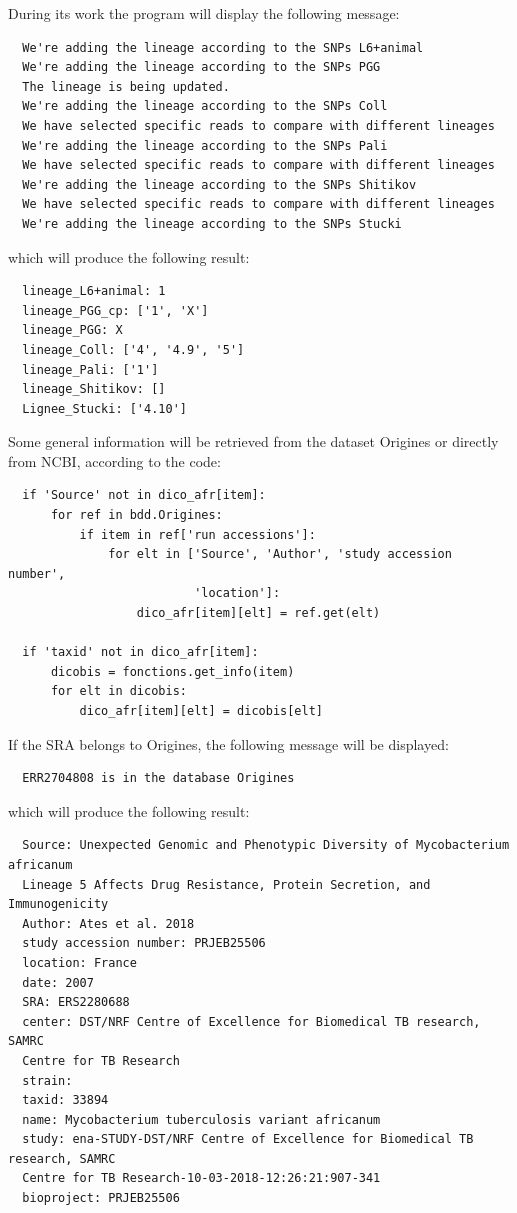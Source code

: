 \documentclass[twoside,a4paper,11pt,frenchb,openany]{report}
\begin{document}
    During its work the program will display the following message:

    \begin{verbatim}
  We're adding the lineage according to the SNPs L6+animal
  We're adding the lineage according to the SNPs PGG
  The lineage is being updated.
  We're adding the lineage according to the SNPs Coll
  We have selected specific reads to compare with different lineages
  We're adding the lineage according to the SNPs Pali
  We have selected specific reads to compare with different lineages
  We're adding the lineage according to the SNPs Shitikov
  We have selected specific reads to compare with different lineages
  We're adding the lineage according to the SNPs Stucki
\end{verbatim}

    which will produce the following result:

    \begin{verbatim}
  lineage_L6+animal: 1
  lineage_PGG_cp: ['1', 'X']
  lineage_PGG: X
  lineage_Coll: ['4', '4.9', '5']
  lineage_Pali: ['1']
  lineage_Shitikov: []
  Lignee_Stucki: ['4.10']
\end{verbatim}

    Some general information will be retrieved from the dataset Origines or
directly from NCBI, according to the code:

\begin{verbatim}
  if 'Source' not in dico_afr[item]:
      for ref in bdd.Origines:
          if item in ref['run accessions']:
              for elt in ['Source', 'Author', 'study accession number',
                          'location']:
                  dico_afr[item][elt] = ref.get(elt)

  if 'taxid' not in dico_afr[item]:
      dicobis = fonctions.get_info(item)
      for elt in dicobis:
          dico_afr[item][elt] = dicobis[elt]
\end{verbatim}

    If the SRA belongs to Origines, the following message will be displayed:

    \begin{verbatim}
  ERR2704808 is in the database Origines
\end{verbatim}

    which will produce the following result:

    \begin{verbatim}
  Source: Unexpected Genomic and Phenotypic Diversity of Mycobacterium africanum   
  Lineage 5 Affects Drug Resistance, Protein Secretion, and Immunogenicity
  Author: Ates et al. 2018
  study accession number: PRJEB25506
  location: France
  date: 2007
  SRA: ERS2280688
  center: DST/NRF Centre of Excellence for Biomedical TB research, SAMRC 
  Centre for TB Research
  strain: 
  taxid: 33894
  name: Mycobacterium tuberculosis variant africanum
  study: ena-STUDY-DST/NRF Centre of Excellence for Biomedical TB research, SAMRC 
  Centre for TB Research-10-03-2018-12:26:21:907-341
  bioproject: PRJEB25506
\end{verbatim}
\end{document}
